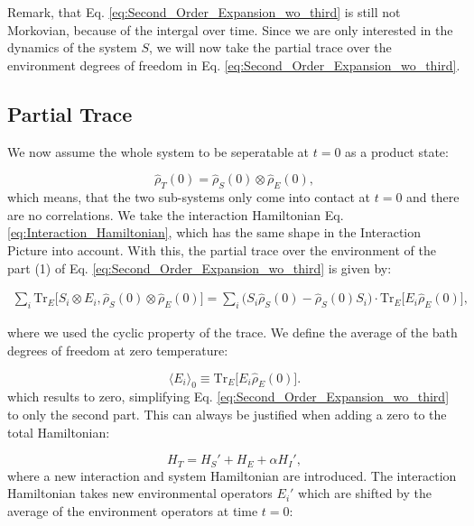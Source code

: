 Remark, that Eq. \eqref{eq:Second_Order_Expansion_wo_third} is still not Morkovian, because of the intergal over time.
Since we are only interested in the dynamics of the system $ S $, we will now take the partial trace over the environment degrees of freedom in Eq. \eqref{eq:Second_Order_Expansion_wo_third}.


\subsection{Partial Trace}
\label{subsec:Partial_Trace}

We now assume the whole system to be seperatable at $ t = 0 $ as a product state:

\begin{equation}
	\hat{\rho}_T(0) = \hat{\rho}_S(0) \otimes \hat{\rho}_E(0),
	\label{eq:Initial_Product_State}
\end{equation}
which means, that the two sub-systems only come into contact at $ t = 0 $ and there are no correlations.
We take the interaction Hamiltonian Eq. \eqref{eq:Interaction_Hamiltonian}, which has the same shape in the Interaction Picture into account.
With this, the partial trace over the environment of the part (1) of Eq. \eqref{eq:Second_Order_Expansion_wo_third} is given by:

\begin{align}
	\sum_i \mathrm{Tr}_E\big[ S_i \otimes E_i , \hat{\rho}_S(0) \otimes \hat{\rho}_E(0)\big]
	= \sum_i \big(S_i \hat{\rho}_S(0) - \hat{\rho}_S(0) S_i\big) \cdot \mathrm{Tr}_E \big[E_i \hat{\rho}_E(0)\big],
	\label{eq:Trace_Relation_first_part}
\end{align}

where we used the cyclic property of the trace.
We define the average of the bath degrees of freedom at zero temperature:

\begin{equation}
	\langle E_i \rangle_0 \equiv \mathrm{Tr}_E \big[E_i \hat{\rho}_E(0)\big].
	\label{eq:Environment_Expectation_Value}
\end{equation}
which results to zero, simplifying Eq. \eqref{eq:Second_Order_Expansion_wo_third} to only the second part.
This can always be justified when adding a zero to the total Hamiltonian:

\begin{equation}
	H_T = H_S' + H_E + \alpha H_I',
	\label{eq:Shifted_Total_Hamiltonian}
\end{equation}
where a new interaction and system Hamiltonian are introduced.
The interaction Hamiltonian takes new environmental operators $E_i'$ which are shifted by the average of the environment operators at time $t = 0$:

